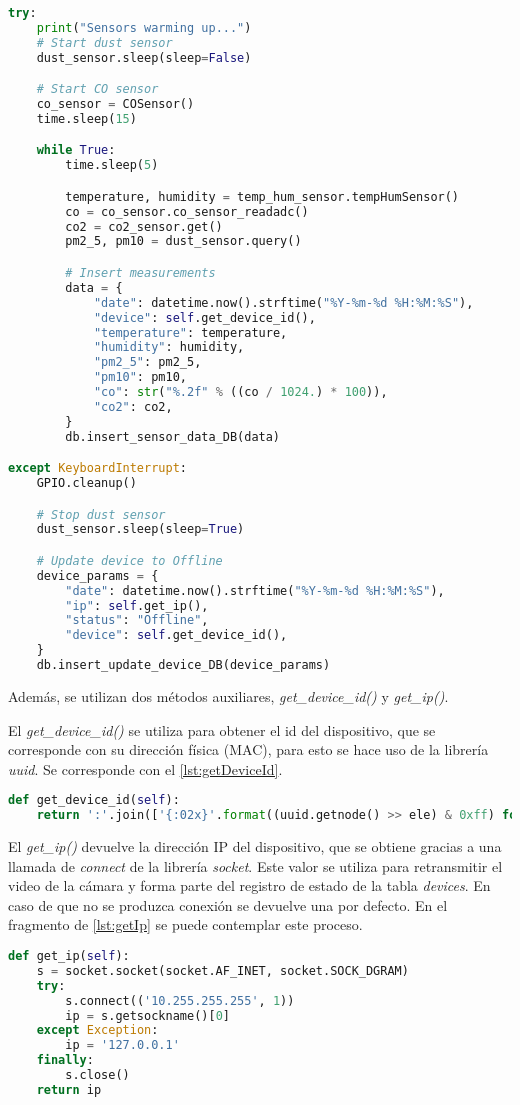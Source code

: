 \begin{lstlisting}[language=Python, label=lst:metodoPrincipal, caption=Método start del programa principal]
try:
    print("Sensors warming up...")
    # Start dust sensor
    dust_sensor.sleep(sleep=False)

    # Start CO sensor
    co_sensor = COSensor()
    time.sleep(15)

    while True:
        time.sleep(5)

        temperature, humidity = temp_hum_sensor.tempHumSensor()
        co = co_sensor.co_sensor_readadc()
        co2 = co2_sensor.get()
        pm2_5, pm10 = dust_sensor.query()

        # Insert measurements
        data = {
            "date": datetime.now().strftime("%Y-%m-%d %H:%M:%S"),
            "device": self.get_device_id(),
            "temperature": temperature,
            "humidity": humidity,
            "pm2_5": pm2_5,
            "pm10": pm10,
            "co": str("%.2f" % ((co / 1024.) * 100)),
            "co2": co2,
        }
        db.insert_sensor_data_DB(data)

except KeyboardInterrupt:
    GPIO.cleanup()

    # Stop dust sensor
    dust_sensor.sleep(sleep=True)

    # Update device to Offline
    device_params = {
        "date": datetime.now().strftime("%Y-%m-%d %H:%M:%S"),
        "ip": self.get_ip(),
        "status": "Offline",
        "device": self.get_device_id(),
    }
    db.insert_update_device_DB(device_params)
\end{lstlisting}
\pagebreak

Además, se utilizan dos métodos auxiliares, \textit{get\_device\_id()} y \textit{get\_ip()}.  

El \textit{get\_device\_id()} se utiliza para obtener el id del dispositivo, que se corresponde con su dirección física (MAC), para esto se hace uso de la librería \textit{uuid}. Se corresponde con el \autoref{lst:getDeviceId}.
\begin{lstlisting}[language=Python, label=lst:getDeviceId, caption=Método get\_device\_id()]
def get_device_id(self):
    return ':'.join(['{:02x}'.format((uuid.getnode() >> ele) & 0xff) for ele in range(0, 8 * 6, 8)][::-1])
\end{lstlisting}

El \textit{get\_ip()} devuelve la dirección IP del dispositivo, que se obtiene gracias a una llamada de \textit{connect} de la librería \textit{socket}. Este valor se utiliza para retransmitir el video de la cámara y forma parte del registro de estado de la tabla \textit{devices}. En caso de que no se produzca conexión se devuelve una por defecto. En el fragmento de \autoref{lst:getIp} se puede contemplar este proceso.
\begin{lstlisting}[language=Python, label=lst:getIp,caption=Método get\_ip()]
def get_ip(self):
    s = socket.socket(socket.AF_INET, socket.SOCK_DGRAM)
    try:
        s.connect(('10.255.255.255', 1))
        ip = s.getsockname()[0]
    except Exception:
        ip = '127.0.0.1'
    finally:
        s.close()
    return ip
\end{lstlisting}
